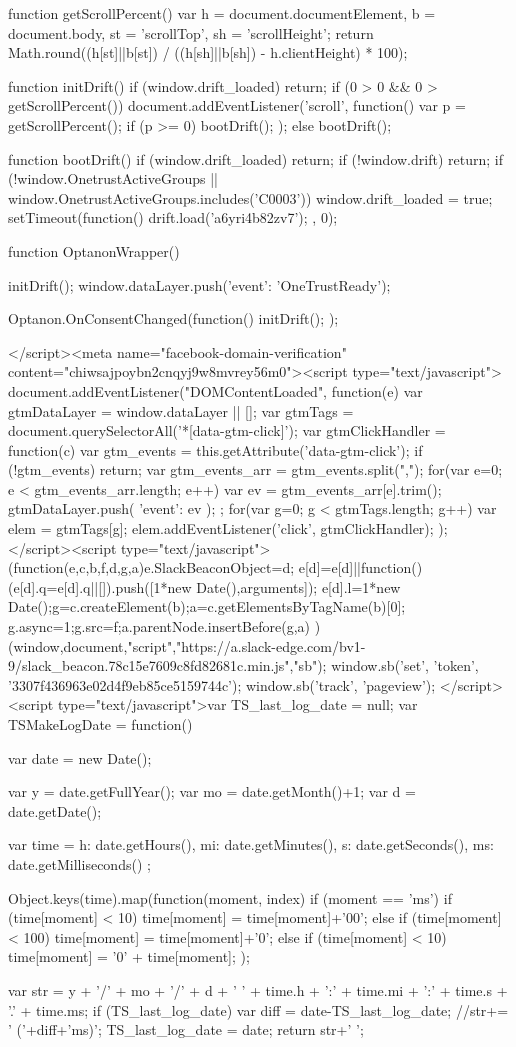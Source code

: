 function getScrollPercent() {
	var h = document.documentElement, b = document.body, st = 'scrollTop', sh = 'scrollHeight';
	return Math.round((h[st]||b[st]) / ((h[sh]||b[sh]) - h.clientHeight) * 100);
}

function initDrift() {
	if (window.drift_loaded) return;
	if (0 > 0 && 0 > getScrollPercent()) {
		document.addEventListener('scroll', function() {
			var p = getScrollPercent();
			if (p >= 0) { bootDrift(); }
		});
	} else { bootDrift(); }
}

function bootDrift() {
	if (window.drift_loaded) return;
	if (!window.drift) return;
	if (!window.OnetrustActiveGroups || window.OnetrustActiveGroups.includes('C0003')) {
		window.drift_loaded = true;
		setTimeout(function() { drift.load('a6yri4b82zv7'); }, 0);
	}
}

function OptanonWrapper() {
	initDrift();
	window.dataLayer.push({'event': 'OneTrustReady'});

	Optanon.OnConsentChanged(function() {
		initDrift();
	});
}</script><meta name="facebook-domain-verification" content="chiwsajpoybn2cnqyj9w8mvrey56m0"><script type="text/javascript">
document.addEventListener("DOMContentLoaded", function(e) {
	var gtmDataLayer = window.dataLayer || [];
	var gtmTags = document.querySelectorAll('*[data-gtm-click]');
	var gtmClickHandler = function(c) {
		var gtm_events = this.getAttribute('data-gtm-click');
		if (!gtm_events) return;
		var gtm_events_arr = gtm_events.split(",");
		for(var e=0; e < gtm_events_arr.length; e++) {
			var ev = gtm_events_arr[e].trim();
			gtmDataLayer.push({ 'event': ev });
		}
	};
	for(var g=0; g < gtmTags.length; g++){
		var elem = gtmTags[g];
		elem.addEventListener('click', gtmClickHandler);
	}
});
</script><script type="text/javascript">
(function(e,c,b,f,d,g,a){e.SlackBeaconObject=d;
e[d]=e[d]||function(){(e[d].q=e[d].q||[]).push([1*new Date(),arguments])};
e[d].l=1*new Date();g=c.createElement(b);a=c.getElementsByTagName(b)[0];
g.async=1;g.src=f;a.parentNode.insertBefore(g,a)
})(window,document,"script","https://a.slack-edge.com/bv1-9/slack_beacon.78c15e7609c8fd82681c.min.js","sb");
window.sb('set', 'token', '3307f436963e02d4f9eb85ce5159744c');
window.sb('track', 'pageview');
</script><script type="text/javascript">var TS_last_log_date = null;
var TSMakeLogDate = function() {
	var date = new Date();

	var y = date.getFullYear();
	var mo = date.getMonth()+1;
	var d = date.getDate();

	var time = {
	  h: date.getHours(),
	  mi: date.getMinutes(),
	  s: date.getSeconds(),
	  ms: date.getMilliseconds()
	};

	Object.keys(time).map(function(moment, index) {
		if (moment == 'ms') {
			if (time[moment] < 10) {
				time[moment] = time[moment]+'00';
			} else if (time[moment] < 100) {
				time[moment] = time[moment]+'0';
			}
		} else if (time[moment] < 10) {
			time[moment] = '0' + time[moment];
		}
	});

	var str = y + '/' + mo + '/' + d + ' ' + time.h + ':' + time.mi + ':' + time.s + '.' + time.ms;
	if (TS_last_log_date) {
		var diff = date-TS_last_log_date;
		//str+= ' ('+diff+'ms)';
	}
	TS_last_log_date = date;
	return str+' ';
}

